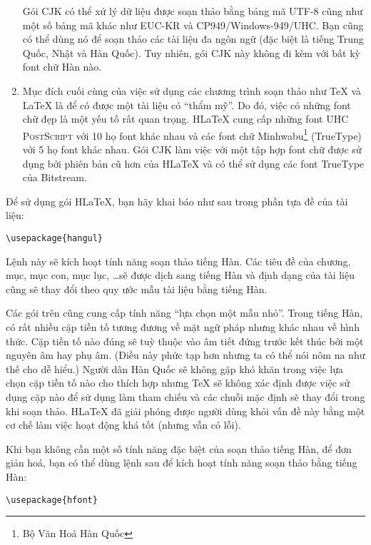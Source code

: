 \begin{enumerate}
Gói CJK có thể xử lý dữ liệu được soạn thảo bằng bảng mã UTF-8
cũng như một số bảng mã khác như EUC-KR và CP949/Windows-949/UHC.
Bạn cũng có thể dùng nó để soạn thảo các tài liệu đa ngôn ngữ (đặc
biệt là tiếng Trung Quốc, Nhật và Hàn Quốc). Tuy nhiên, gói CJK
này không đi kèm với bất kỳ font chữ Hàn nào.

\item  Mục đích cuối cùng của việc sử dụng các chương trình soạn
thảo như \TeX{} và \LaTeX{} là để có được một tài liệu có ``thẩm
mỹ''. Do đó, việc có những font chữ đẹp là một yếu tố rất quan
trọng. H\LaTeX{} cung cấp những font 
UHC \textsc{PostScript} với 10 họ font khác nhau và các font chữ
Minhwabu\footnote{Bộ Văn Hoá Hàn Quốc} (TrueType) với 5 họ font
khác nhau. Gói CJK làm việc với một tập hợp font chữ được sử dụng
bởi phiên bản cũ hơn của H\LaTeX{} và có thể sử dụng các font
\mbox{TrueType} của Bitstream.
\end{enumerate}

Để sử dụng gói H\LaTeX{}, bạn hãy khai báo như sau trong phần tựa
đề của tài liệu:
\begin{lscommand}
\verb+\usepackage{hangul}+
\end{lscommand}

Lệnh này sẽ kích hoạt tính năng soạn thảo tiếng Hàn. Các tiêu đề
của chương, mục, mục con, mục lục, \ldots sẽ được dịch sang tiếng
Hàn và định dạng của tài liệu cũng sẽ thay đổi theo quy ước mẫu
tài liệu bằng tiếng Hàn.

Các gói trên cũng cung cấp tính năng ``lựa chọn một mẫu nhỏ''.
Trong tiếng Hàn, có rất nhiều cặp tiền tố tương đương về mặt ngữ
pháp nhưng khác nhau về hình thức. Cặp tiền tố nào đúng sẽ tuỳ
thuộc vào âm tiết đứng trước kết thúc bởi một nguyên âm hay phụ
âm. (Điều này phức tạp hơn nhưng ta có thể nói nôm na như thế cho
dễ hiểu.) Người dân Hàn Quốc sẽ không gặp khó khăn trong việc lựa
chọn cặp tiền tố nào cho thích hợp nhưng \TeX{} sẽ không xác định
được việc sử dụng cặp nào để sử dụng làm tham chiếu và các chuỗi
mặc định sẽ thay đổi trong khi soạn thảo. H\LaTeX{} đã giải phóng
được người dùng khỏi vấn đề này bằng một cơ chế làm việc hoạt động
khá tốt (nhưng vẫn có lỗi).

Khi bạn không cần một số tính năng đặc biệt của soạn thảo tiếng
Hàn, để đơn giản hoá, bạn có thể dùng lệnh sau để kích hoạt tính
năng soạn thảo bằng tiếng Hàn:
\begin{lscommand}
\verb+\usepackage{hfont}+
\end{lscommand}

